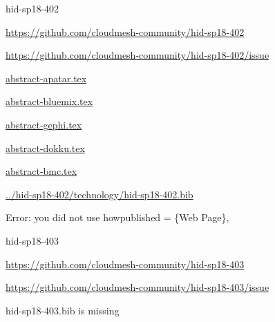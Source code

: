 \begin{IU}

hid-sp18-402

\url{https://github.com/cloudmesh-community/hid-sp18-402}

\url{https://github.com/cloudmesh-community/hid-sp18-402/issue}

\href{https://github.com/cloudmesh-community/hid-sp18-402/blob/master//technology/abstract-apatar.tex}{abstract-apatar.tex}

\href{https://github.com/cloudmesh-community/hid-sp18-402/blob/master//technology/abstract-bluemix.tex}{abstract-bluemix.tex}

\href{https://github.com/cloudmesh-community/hid-sp18-402/blob/master//technology/abstract-gephi.tex}{abstract-gephi.tex}

\href{https://github.com/cloudmesh-community/hid-sp18-402/blob/master//technology/abstract-dokku.tex}{abstract-dokku.tex}

\href{https://github.com/cloudmesh-community/hid-sp18-402/blob/master//technology/abstract-bmc.tex}{abstract-bmc.tex}

\href{https://github.com/cloudmesh-community/hid-sp18-402/blob/master//technology/hid-sp18-402.bib}{../hid-sp18-402/technology/hid-sp18-402.bib}

Error: you did not use howpublished = \{Web Page\},

\end{IU}


\begin{IU}

hid-sp18-403

\url{https://github.com/cloudmesh-community/hid-sp18-403}

\url{https://github.com/cloudmesh-community/hid-sp18-403/issue}

hid-sp18-403.bib is missing

\end{IU}



